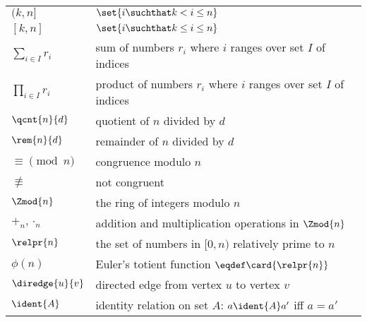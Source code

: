 \begin{center}
\begin{tabular}{ll}
$(k, n]$       & $\set{i \suchthat k < i \le n}$\\
$[k,n]$        & $\set{i \suchthat k \le i \le n}$\\
$\sum_{i \in I} r_i$ & sum of numbers $r_i$ where $i$ ranges over
set $I$ of indices\\
$\prod_{i \in I} r_i$ & product of numbers $r_i$ where $i$ ranges over
set $I$ of indices\\
$\qcnt{n}{d}$  & quotient of $n$ divided by $d$\\
$\rem{n}{d}$   & remainder of $n$ divided by $d$\\
$\equiv \pmod{n}$ & congruence modulo $n$\\
$\not\equiv$   & not congruent\\
$\Zmod{n}$     & the ring of integers modulo $n$\\
$+_n, \cdot_n$ & addition and multiplication operations in $\Zmod{n}$\\
$\relpr{n}$    & the set of numbers in $[0,n)$ relatively prime to $n$\\
$\phi(n)$      & Euler's totient function $\eqdef \card{\relpr{n}}$\\
$\diredge{u}{v}$ & directed edge from vertex $u$ to vertex $v$\\
$\ident{A}$    & identity relation on set $A$: $a \ident{A} a'$ iff $a = a'$
\end{tabular}
\end{center}


